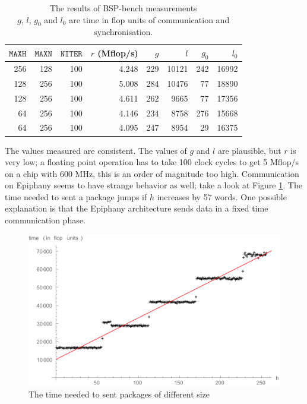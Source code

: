 \documentclass[fleqn]{article}
\renewcommand{\(}{\left(}
\renewcommand{\)}{\right)}
\begin{document}
\begin{table}[h]
\centering
\begin{tabular}{rrr|rrrrr}
$\mathtt{MAXH}$ & $\mathtt{MAXN}$ & $\mathtt{NITER}$ & $r$ (Mflop/s) & $g$ & $l$ & $g_0$ & $l_0$ \\
\hline
256 & 128 & 100 & 4.248 & 229 & 10121 & 242 & 16992 \\
128 & 256 & 100 & 5.008 & 284 & 10476 &  77 & 18890 \\
128 & 256 & 100 & 4.611 & 262 &  9665 &  77 & 17356 \\
 64 & 256 & 100 & 4.146 & 234 &  8758 & 276 & 15668 \\
 64 & 256 & 100 & 4.095 & 247 &  8954 &  29 & 16375 \\
\end{tabular}
\caption{The results of BSP-bench measurements\\ $g$, $l$, $g_0$ and $l_0$ are time in flop units of communication and synchronisation.}
\end{table}

The values measured are consistent. The values of $g$ and $l$ are plausible, but $r$ is very low; a floating point operation has to take 100 clock cycles to get 5 Mflop/s on a chip with 600 MHz, this is an order of magnitude too high. Communication on Epiphany seems to have strange behavior as well; take a look at Figure \ref{fig:bspbench}. The time needed to sent a package jumps if $h$ increases by 57 words. One possible explanation is that the Epiphany architecture sends data in a fixed time communication phase.

\begin{centering}
\begin{figure}[h!]
\centering
\includegraphics[scale=0.8]{EpiphanyGandL.pdf}
\caption{The time needed to sent packages of different size}
\label{fig:bspbench}
\end{figure}
\end{centering}
\end{document}

